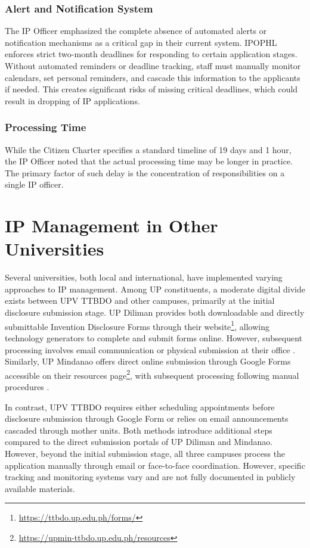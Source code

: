 \subsubsection{Alert and Notification System}
The IP Officer emphasized the complete absence of automated alerts or notification mechanisms as a critical gap in their current system. IPOPHL enforces strict two-month deadlines for responding to certain application stages. Without automated reminders or deadline tracking, staff must manually monitor calendars, set personal reminders, and cascade this information to the applicants if needed. This creates significant risks of missing critical deadlines, which could result in dropping of IP applications.

\subsubsection{Processing Time}
While the Citizen Charter specifies a standard timeline of 19 days and 1 hour, the IP Officer noted that the actual processing time may be longer in practice. The primary factor of such delay is the concentration of responsibilities on a single IP officer.

\section{IP Management in Other Universities}

Several universities, both local and international, have implemented varying approaches to IP management. Among UP constituents, a moderate digital divide exists between UPV TTBDO and other campuses, primarily at the initial disclosure submission stage. UP Diliman provides both downloadable and directly submittable Invention Disclosure Forms through their website\footnote{\url{https://ttbdo.up.edu.ph/forms/}}, allowing technology generators to complete and submit forms online. However, subsequent processing involves email communication or physical submission at their office \cite[p.~6]{upd2020ovcrd}. Similarly, UP Mindanao offers direct online submission through Google Forms accessible on their resources page\footnote{\url{https://upmin-ttbdo.up.edu.ph/resources}}, with subsequent processing following manual procedures \cite[pp.~70--75]{upmindanao2024citizenscharter}.

In contrast, UPV TTBDO requires either scheduling appointments before disclosure submission through Google Form or relies on email announcements cascaded through mother units. Both methods introduce additional steps compared to the direct submission portals of UP Diliman and Mindanao. However, beyond the initial submission stage, all three campuses process the application manually through email or face-to-face coordination. However, specific tracking and monitoring systems vary and are not fully documented in publicly available materials.


